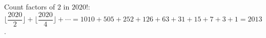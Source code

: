 Count factors of $2$ in $2020!$: $\lfloor\dfrac{2020}{2}\rfloor+\lfloor\dfrac{2020}{4}\rfloor+\cdots=1010+505+252+126+63+31+15+7+3+1=\boxed{2013}$.
